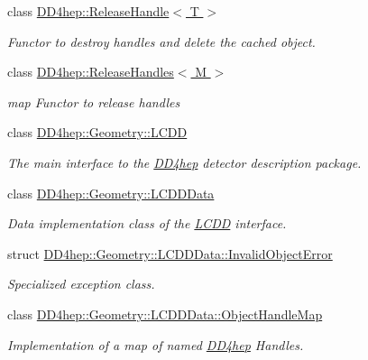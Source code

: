 \begin{DoxyCompactItemize}
class \hyperlink{class_d_d4hep_1_1_release_handle}{DD4hep::ReleaseHandle$<$ T $>$}
\begin{DoxyCompactList}\small\item\em Functor to destroy handles and delete the cached object. \item\end{DoxyCompactList}\item 
class \hyperlink{class_d_d4hep_1_1_release_handles}{DD4hep::ReleaseHandles$<$ M $>$}
\begin{DoxyCompactList}\small\item\em map Functor to release handles \item\end{DoxyCompactList}\item 
class \hyperlink{class_d_d4hep_1_1_geometry_1_1_l_c_d_d}{DD4hep::Geometry::LCDD}
\begin{DoxyCompactList}\small\item\em The main interface to the \hyperlink{namespace_d_d4hep}{DD4hep} detector description package. \item\end{DoxyCompactList}\item 
class \hyperlink{class_d_d4hep_1_1_geometry_1_1_l_c_d_d_data}{DD4hep::Geometry::LCDDData}
\begin{DoxyCompactList}\small\item\em Data implementation class of the \hyperlink{class_d_d4hep_1_1_geometry_1_1_l_c_d_d}{LCDD} interface. \item\end{DoxyCompactList}\item 
struct \hyperlink{struct_d_d4hep_1_1_geometry_1_1_l_c_d_d_data_1_1_invalid_object_error}{DD4hep::Geometry::LCDDData::InvalidObjectError}
\begin{DoxyCompactList}\small\item\em Specialized exception class. \item\end{DoxyCompactList}\item 
class \hyperlink{class_d_d4hep_1_1_geometry_1_1_l_c_d_d_data_1_1_object_handle_map}{DD4hep::Geometry::LCDDData::ObjectHandleMap}
\begin{DoxyCompactList}\small\item\em Implementation of a map of named \hyperlink{namespace_d_d4hep}{DD4hep} Handles. \item\end{DoxyCompactList}\item 

\end{DoxyCompactItemize}
